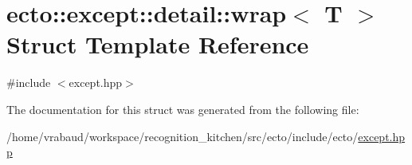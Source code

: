 \hypertarget{structecto_1_1except_1_1detail_1_1wrap}{}\section{ecto\+:\+:except\+:\+:detail\+:\+:wrap$<$ T $>$ Struct Template Reference}
\label{structecto_1_1except_1_1detail_1_1wrap}


{\ttfamily \#include $<$except.\+hpp$>$}



The documentation for this struct was generated from the following file\+:\begin{DoxyCompactItemize}
\item 
/home/vrabaud/workspace/recognition\+\_\+kitchen/src/ecto/include/ecto/\hyperlink{except_8hpp}{except.\+hpp}\end{DoxyCompactItemize}
